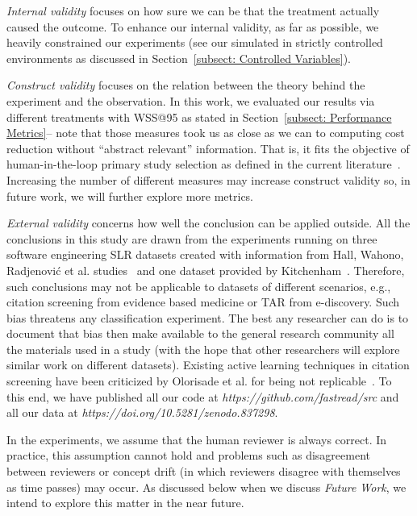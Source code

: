\documentclass{svjour3}
\theoremstyle{break}
\begin{document}
{\em Internal validity} focuses on how sure we can be that the treatment
actually caused the outcome. To enhance our internal validity,
as far as possible, we heavily constrained our experiments
(see  our simulated in strictly controlled environments as discussed in Section~\ref{subsect: Controlled Variables}).

{\em Construct validity} focuses on the relation between the theory
behind the experiment and the observation. In this work, we evaluated
our results via different treatments with WSS@95 as stated in Section~\ref{subsect: Performance Metrics}-- note that those
measures took us as close as we can to computing
cost reduction without ``abstract relevant'' information. 
That is, it fits the objective of human-in-the-loop primary study selection as defined in the current literature~\cite{tredennick2015,cormack2015autonomy,cormack2014evaluation}. Increasing the number of different measures may increase construct validity
so, in future work, we will further explore more metrics.

{\em External validity }concerns how well the conclusion can be applied outside. All the conclusions in this study are drawn from the experiments running on three software engineering SLR datasets created with information from Hall, Wahono, Radjenovi{\'c} et al. studies~\cite{hall2012systematic,wahono2015systematic,radjenovic2013software} and one dataset provided by Kitchenham~\cite{kitchenham2010systematic}. Therefore, such conclusions may not be applicable to datasets of different scenarios, e.g., citation screening from evidence based medicine or TAR from e-discovery. Such bias threatens any classification experiment. The best any researcher can do is to document that bias then make available to the general research community all the materials used in a study (with the hope that other researchers will explore similar work on different datasets). Existing active learning techniques in citation screening have been criticized by Olorisade et al. for being not replicable~\cite{olorisade2016critical,olorisade2017reproducibility}. To this end, we have published all our code at \textit{https://github.com/fastread/src} and all our data at \textit{https://doi.org/10.5281/zenodo.837298}.

In the experiments, we assume that the human reviewer is always correct. In practice, this assumption cannot hold and problems such as disagreement between reviewers or concept drift (in which reviewers disagree with themselves as time passes) may occur.  As discussed
below when we discuss {\em Future Work}, we intend to explore this matter in the near future.
\end{document}
